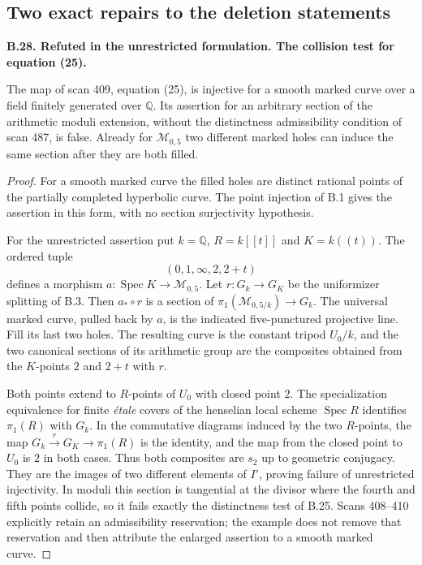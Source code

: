 \documentclass[11pt,oneside]{article}
\makeatletter
\newcounter{statementanchor}
\newenvironment{statement}[3]{%
 \refstepcounter{statementanchor}\def\@currentlabel{#1}%
 \par\addvspace{9pt}\noindent
 \textbf{#1. #2. #3.}\par\nobreak\noindent\ignorespaces
}{\par\addvspace{5pt}}
\makeatother
\begin{document}
\subsection{Two exact repairs to the deletion statements}

\begin{statement}{B.28}{Refuted in the unrestricted formulation}{The collision test for equation (25)}
\label{st:B.28}

The map of scan 409, equation (25), is injective for a smooth
marked curve over a field finitely generated over $\mathbb Q$.
Its assertion for an arbitrary section of the arithmetic moduli
extension, without the distinctness admissibility condition of
scan 487, is false.  Already for $\mathcal M_{0,5}$ two different
marked holes can induce the same section after they are both filled.
\end{statement}
\begin{proof}
For a smooth marked curve the filled holes are distinct rational
points of the partially completed hyperbolic curve.  The point
injection of B.1 gives the assertion in this form, with no section
surjectivity hypothesis.

For the unrestricted assertion put $k=\mathbb Q$,
$R=k[[t]]$ and $K=k((t))$.  The ordered tuple
\[
 (0,1,\infty,2,2+t)
\]
defines a morphism $a:\operatorname{Spec}K\to\mathcal M_{0,5}$.
Let $r:G_k\to G_K$ be the uniformizer splitting of B.3.
Then $a_*\circ r$ is a section of
$\pi_1(\mathcal M_{0,5/k})\to G_k$.
The universal marked curve, pulled back by $a$, is the indicated
five-punctured projective line.  Fill its last two holes.  The
resulting curve is the constant tripod $U_0/k$, and the two
canonical sections of its arithmetic group are the composites
obtained from the $K$-points $2$ and $2+t$ with $r$.

Both points extend to $R$-points of $U_0$ with closed point $2$.
The specialization equivalence for finite \emph{\'etale} covers of
the henselian local scheme $\operatorname{Spec}R$ identifies
$\pi_1(R)$ with $G_k$.  In the commutative diagrams induced by the
two $R$-points, the map $G_k\xrightarrow{r}G_K\to\pi_1(R)$ is the
identity, and the map from the closed point to $U_0$ is $2$ in both
cases.  Thus both composites are $s_2$ up to geometric conjugacy.
They are the images of two different elements of $I'$, proving
failure of unrestricted injectivity.  In moduli this section is
tangential at the divisor where the fourth and fifth points
collide, so it fails exactly the distinctness test of B.25.
Scans 408--410 explicitly retain an admissibility reservation;
the example does not remove that reservation and then attribute
the enlarged assertion to a smooth marked curve.
\end{proof}
\end{document}
